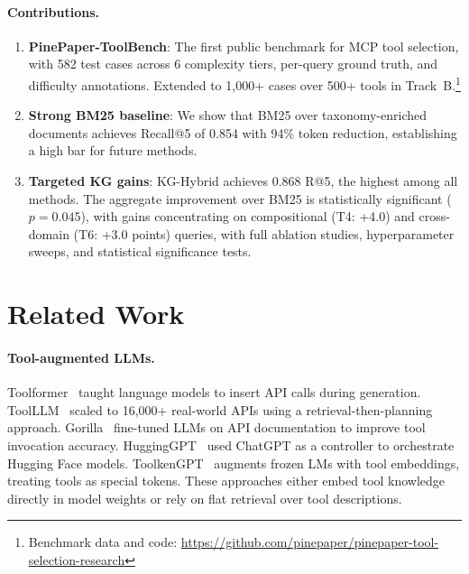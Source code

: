 \documentclass[11pt,a4paper]{article}
\begin{document}
\paragraph{Contributions.}
\begin{enumerate}
  \item \textbf{PinePaper-ToolBench}: The first public benchmark for MCP tool selection, with 582 test cases across 6 complexity tiers, per-query ground truth, and difficulty annotations. Extended to 1,000+ cases over 500+ tools in Track~B.\footnote{Benchmark data and code: \url{https://github.com/pinepaper/pinepaper-tool-selection-research}}
  \item \textbf{Strong BM25 baseline}: We show that BM25 over taxonomy-enriched documents achieves Recall@5 of 0.854 with 94\% token reduction, establishing a high bar for future methods.
  \item \textbf{Targeted KG gains}: KG-Hybrid achieves 0.868 R@5, the highest among all methods. The aggregate improvement over BM25 is statistically significant ($p=0.045$), with gains concentrating on compositional (T4: +4.0) and cross-domain (T6: +3.0 points) queries, with full ablation studies, hyperparameter sweeps, and statistical significance tests.
\end{enumerate}

\section{Related Work}
\label{sec:related}

\paragraph{Tool-augmented LLMs.}
Toolformer~\citep{schick2024toolformer} taught language models to insert API calls during generation. ToolLLM~\citep{qin2024toolllm} scaled to 16,000+ real-world APIs using a retrieval-then-planning approach. Gorilla~\citep{patil2023gorilla} fine-tuned LLMs on API documentation to improve tool invocation accuracy. HuggingGPT~\citep{shen2024hugginggpt} used ChatGPT as a controller to orchestrate Hugging Face models. ToolkenGPT~\citep{hao2024toolkengpt} augments frozen LMs with tool embeddings, treating tools as special tokens. These approaches either embed tool knowledge directly in model weights or rely on flat retrieval over tool descriptions.
\end{document}
